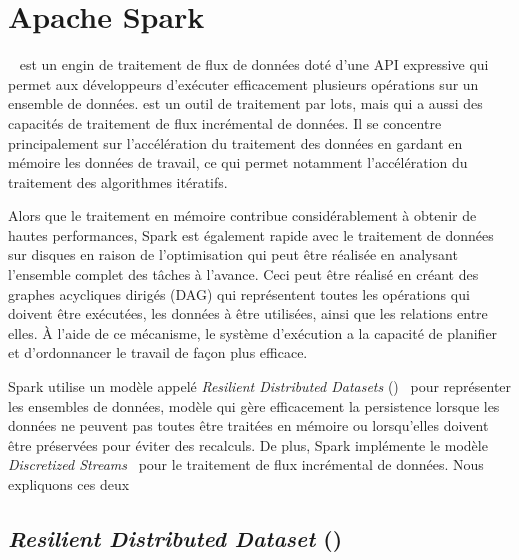 \section{Apache Spark}




~\citep{apachSpark} est un engin de traitement de flux de donn\'ees dot\'e d'une API expressive qui permet aux d\'eveloppeurs d'ex\'ecuter efficacement plusieurs op\'erations sur un ensemble de donn\'ees.  est un outil de traitement par lots, mais qui a aussi des capacit\'es de traitement de flux incr\'emental de donn\'ees. Il se concentre principalement sur l'acc\'el\'eration du traitement des donn\'ees en gardant en m\'emoire les donn\'ees de travail, ce qui permet notamment l'acc\'el\'eration du traitement des algorithmes it\'eratifs.

Alors que le traitement en m\'emoire contribue consid\'erablement \`a obtenir de hautes performances, Spark est \'egalement rapide avec le traitement de donn\'ees sur disques en raison de l'optimisation qui peut \^etre r\'ealis\'ee en analysant l'ensemble complet des t\^aches \`a l'avance. Ceci peut \^etre r\'ealis\'e en cr\'eant des graphes acycliques dirig\'es (DAG) qui repr\'esentent toutes les op\'erations qui doivent \^etre ex\'ecut\'ees, les donn\'ees \`a \^etre utilis\'ees, ainsi que les relations entre elles. \`A l'aide de ce m\'ecanisme, le syst\`eme d'ex\'ecution a la capacit\'e de planifier et d'ordonnancer le travail de fa\c{c}on plus efficace.

Spark utilise un mod\`ele appel\'e \emph{Resilient Distributed Datasets} ()~\citep{Salloum2016} pour repr\'esenter les ensembles de donn\'ees, mod\`ele qui g\`ere efficacement la persistence lorsque les donn\'ees ne peuvent pas toutes \^etre trait\'ees en m\'emoire ou lorsqu'elles doivent \^etre pr\'eserv\'ees pour \'eviter des recalculs. De plus, Spark impl\'emente le mod\`ele \emph{Discretized Streams}~\citep{zaharia2013discretized} pour le traitement de flux incr\'emental de donn\'ees.
%
Nous expliquons ces deux 


\subsection*{\emph{Resilient Distributed Dataset} ()}

